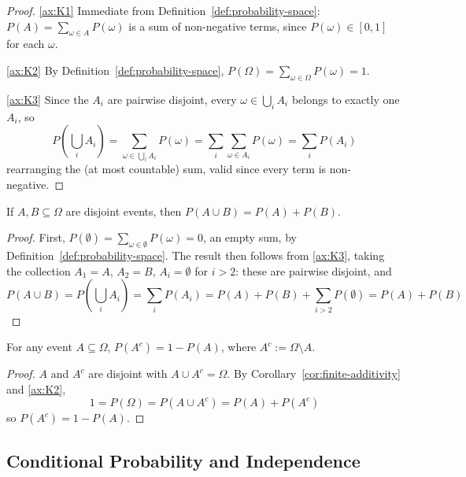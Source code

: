 		\begin{proof}
			\ref{ax:K1} Immediate from Definition~\ref{def:probability-space}: $P(A)=\sum_{\omega\in A}P(\omega)$ is a sum of non-negative terms, since $P(\omega)\in[0,1]$ for each $\omega$.
			
			\ref{ax:K2} By Definition~\ref{def:probability-space}, $P(\Omega) = \sum_{\omega\in\Omega}P(\omega) = 1$.
			
			\ref{ax:K3} Since the $A_i$ are pairwise disjoint, every $\omega\in\bigcup_iA_i$ belongs to exactly one $A_i$, so
			\[
				P\left(\bigcup_i A_i\right) = \sum_{\omega\in\bigcup_iA_i} P(\omega) = \sum_i \sum_{\omega\in A_i} P(\omega) = \sum_i P(A_i)
			\]
			rearranging the (at most countable) sum, valid since every term is non-negative.
		\end{proof}
		
		\begin{corollary}
			\label{cor:finite-additivity}
			If $A,B\subseteq\Omega$ are disjoint events, then $P(A\cup B) = P(A)+P(B)$.
		\end{corollary}
		
		\begin{proof}
			First, $P(\emptyset) = \sum_{\omega\in\emptyset} P(\omega) = 0$, an empty sum, by Definition~\ref{def:probability-space}. The result then follows from \ref{ax:K3}, taking the collection $A_1=A$, $A_2=B$, $A_i=\emptyset$ for $i>2$: these are pairwise disjoint, and
			\[
				P(A\cup B) = P\left(\bigcup_i A_i\right) = \sum_i P(A_i) = P(A)+P(B) + \sum_{i>2} P(\emptyset) = P(A)+P(B)
			\]
		\end{proof}
		
		\begin{corollary}
			\label{cor:complement-rule}
			For any event $A\subseteq\Omega$, $P(A^c) = 1-P(A)$, where $A^c := \Omega\setminus A$.
		\end{corollary}
		
		\begin{proof}
			$A$ and $A^c$ are disjoint with $A\cup A^c=\Omega$. By Corollary~\ref{cor:finite-additivity} and \ref{ax:K2},
			\[
				1 = P(\Omega) = P(A\cup A^c) = P(A) + P(A^c)
			\]
			so $P(A^c) = 1-P(A)$.
		\end{proof}
		
	\subsection{Conditional Probability and Independence}
		
